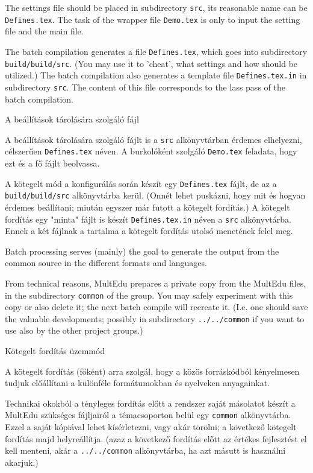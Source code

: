 {
The settings file should be placed in subdirectory \lstinline|src|, its reasonable name can be
\lstinline|Defines.tex|. The task of the wrapper file \lstinline|Demo.tex| is only to input
the setting file and the main file.

The batch compilation generates a file \lstinline|Defines.tex|, which goes into subdirectory
\lstinline|build/build/src|. (You may use it to 'cheat', what settings and how should be utilized.)
The batch compilation also generates a template file \lstinline|Defines.tex.in| in subdirectory \lstinline|src|.
The content of this file corresponds to the lass pass of the batch compilation.
}
{A beállítások tárolására szolgáló fájl}
{
A beállítások tárolására szolgáló fájlt is a \lstinline|src| alkönyvtárban érdemes elhelyezni,
célszerűen \lstinline|Defines.tex| néven. A burkolóként szolgáló \lstinline|Demo.tex| feladata, hogy
ezt és a fő fájlt beolvassa.

A kötegelt mód a konfigurálás során készít egy \lstinline|Defines.tex| fájlt, de az a \lstinline|build/build/src|
alkönyvtárba kerül. (Onnét lehet puskázni, hogy mit és hogyan érdemes beállítani; miután egyszer már futott
a kötegelt fordítás.) A kötegelt fordítás egy "minta" fájlt is készít \lstinline|Defines.tex.in| néven a
\lstinline|src| alkönyvtárba. Ennek a két fájlnak a tartalma a kötegelt fordítás utolsó menetének felel meg.
}


{
Batch processing serves (mainly) the goal to generate the output
from the common source in the different formats and languages.

From technical reasons, MultEdu prepares a private copy from
the MultEdu files, in the subdirectory \lstinline|common|  of the group.
You may safely experiment with this copy or also delete it; the next
batch compile will recreate it. (I.e. one should save the valuable developments; possibly in subdirectory \lstinline|../../common|
if you want to use also by the other project groups.)
}
{Kötegelt fordítás üzemmód}
{
A kötegelt fordítás (főként) arra szolgál, hogy a közös forráskódból kényelmesen tudjuk
előállítani a különféle formátumokban és nyelveken anyagainkat.

Technikai okokból a tényleges fordítás előtt a rendszer saját másolatot
készít a MultEdu szükséges fájljairól a témacsoporton belül egy \lstinline|common| alkönyvtárba.
Ezzel a saját kópiával lehet kísérletezni, vagy akár törölni;
a következő kötegelt fordítás majd helyreállítja. (azaz a következő fordítás előtt az értékes fejlesztést el kell menteni, akár a \lstinline|../../common| alkönyvtárba, ha azt másutt is használni akarjuk.)
}

